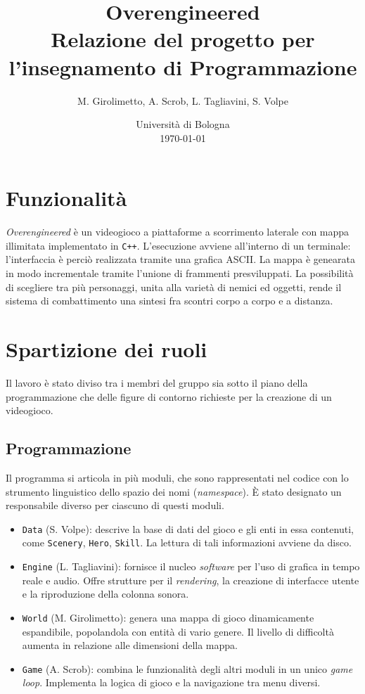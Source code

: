 \documentclass[a4paper]{article}
\title{Overengineered \\
\large Relazione del progetto per l'insegnamento di Programmazione}
\author{
  M. Girolimetto,
  A. Scrob,
  L. Tagliavini,
  S. Volpe
}
\date{
	Universit\`a di Bologna \\
  \today
}
\begin{document}
\maketitle

\section{Funzionalit\`a}

\emph{Overengineered} \`e un videogioco a piattaforme a scorrimento laterale con mappa
illimitata implementato in \verb!C++!. L'esecuzione avviene all'interno di un terminale:
l'interfaccia \`e perci\`o realizzata tramite una grafica ASCII. La mappa \`e
genearata in modo incrementale tramite l'unione di frammenti presviluppati. La
possibilit\`a di scegliere tra pi\`u personaggi, unita alla variet\`a di nemici
ed oggetti, rende il sistema di combattimento una sintesi fra scontri corpo a
corpo e a distanza.

\section{Spartizione dei ruoli}

Il lavoro \`e stato diviso tra i membri del gruppo sia sotto il piano della
programmazione che delle figure di contorno richieste per la creazione di un videogioco.

\subsection{Programmazione}

Il programma si articola in pi\`u moduli, che sono rappresentati nel codice con
lo strumento linguistico dello spazio dei nomi (\emph{namespace}). \`E stato
designato un responsabile diverso per ciascuno di questi moduli.
\begin{itemize}
  \item \verb!Data! (S. Volpe): descrive la base di dati del gioco e gli enti in
    essa contenuti, come \verb!Scenery!, \verb!Hero!, \verb!Skill!. La lettura
    di tali informazioni avviene da disco.
  \item \verb!Engine! (L. Tagliavini): fornisce il nucleo \emph{software} per
    l'uso di grafica in tempo reale e audio. Offre strutture per il
    \emph{rendering}, la creazione di interfacce utente e la riproduzione della
    colonna sonora. %
  \item \verb!World! (M. Girolimetto): genera una mappa di gioco dinamicamente
    espandibile, popolandola con entit\`a di vario genere. Il livello di
    difficolt\`a aumenta in relazione alle dimensioni della mappa.
  \item \verb!Game! (A. Scrob): combina le funzionalit\`a degli altri moduli in
    un unico \emph{game loop}. Implementa la logica di gioco e la navigazione
    tra menu diversi.
\end{itemize}
\end{document}
